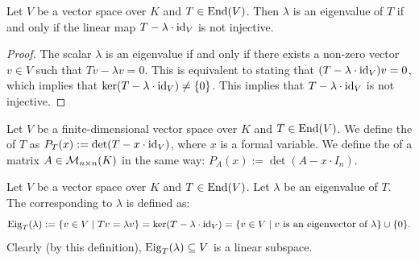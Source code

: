 \begin{proposition}\label{prop:eigen_injective}
  Let $V$ be a vector space over $K$ and $T \in \operatorname{End}(V)$. Then $\lambda$ is an eigenvalue of $T$ if and only if the linear map $T - \lambda \cdot \operatorname{id}_V$ is not injective.
\end{proposition}

\begin{proof}
  The scalar $\lambda$ is an eigenvalue if and only if there exists a non-zero vector $v \in V$ such that $Tv - \lambda v = 0$. This is equivalent to stating that $(T - \lambda \cdot \operatorname{id}_V)v = 0$, which implies that $\ker(T - \lambda \cdot \operatorname{id}_V) \ne \{0\}$.
  This implies that $T - \lambda \cdot \operatorname{id}_V$ is not injective.
\end{proof}
\begin{definition}\label{def:char_poly}
  Let $V$ be a finite-di\-men\-sional vector space over $K$ and $T \in \operatorname{End}(V)$. We define the  of $T$ as $P_T(x) := \det(T - x \cdot \operatorname{id}_V)$, where $x$ is a formal variable. We define the  of a matrix $A \in \mathcal{M}_{n \times n}(K)$ in the same way: $P_A(x) := \det(A - x \cdot I_n)$.
\end{definition}

\begin{definition}[Eigenspace]\label{def:eigenspace}
  Let $V$ be a vector space over $K$ and $T \in \operatorname{End}(V)$. Let $\lambda$ be an eigenvalue of $T$. The  corresponding to $\lambda$ is defined as:
  \[ \operatorname{Eig}_T(\lambda) := \{v \in V \mid Tv = \lambda v\} = \ker(T - \lambda \cdot \operatorname{id}_V) = \{v \in V \mid v \text{ is an eigenvector of } \lambda\} \cup \{0\}. \]
  Clearly (by this definition), $\operatorname{Eig}_T(\lambda) \subseteq V$ is a linear subspace.
\end{definition}

